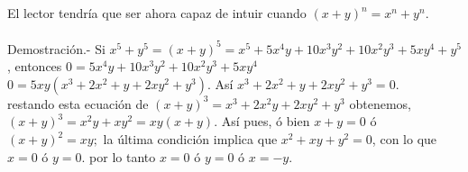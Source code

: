 \begin{lema}
\begin{enumerate}[\bfseries a)]
El lector tendría que ser ahora capaz de intuir cuando $(x+y)^n=x^n+y^n$.\\\\
Demostración.- \; Si $x^5+y^5=(x+y)^5=x^5+5x^4y+10x^3y^2+10x^2y^3+5xy^4+y^5$, entonces $0=5x^4y+10x^3y^2+10x^2y^3+5xy^4$ $0=5xy(x^3+2x^2+y+2xy^2+y^3)$. Así $x^3+2x^2+y+2xy^2+y^3=0$.\\
restando esta ecuación de $(x+y)^3=x^3+2x^2y+2xy^2+y^3$ obtenemos, $(x+y)^3=x^2y+xy^2=xy(x+y)$. Así pues, ó bien $x+y=0$ ó $(x+y)^2=xy;$ la última condición implica que $x^2+xy+y^2=0$, con lo que $x=0$ ó $y=0$. por lo tanto $x=0$ ó $y=0$ ó $x=-y$.\\\\
\end{enumerate}
\end{lema}

